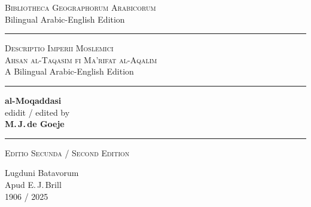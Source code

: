 \documentclass[11pt,a4paper]{article}
\newcommand{\shortline}{\noindent\rule{0.5\textwidth}{0.4pt}\par}
\begin{document}
\thispagestyle{empty}
\begin{center}
\vspace*{2cm}

{\Large\textsc{Bibliotheca Geographorum Arabicorum}}\\[0.3cm]
{\small Bilingual Arabic-English Edition}\\[1.5cm]

\shortline
\vspace{0.8cm}

{\LARGE\scshape Descriptio Imperii Moslemici}\\[0.3cm]
{\large\scshape Ahsan al-Taqasim fi Ma'rifat al-Aqalim}\\[0.3cm]
{\large A Bilingual Arabic-English Edition}\\[0.5cm]

\shortline
\vspace{0.8cm}

{\Large\bfseries al-Moqaddasi}\\[0.3cm]
{\large edidit / edited by}\\[0.3cm]
{\Large\bfseries M.\,J.\,de Goeje}\\[0.8cm]

\shortline
\vspace{0.8cm}

{\large\textsc{Editio Secunda / Second Edition}}\\[1cm]

\vfill

{\large Lugduni Batavorum}\\
{\large Apud E.\,J.\,Brill}\\
{\large 1906 / 2025}\\

\vspace{1.5cm}

\end{center}
\clearpage
\end{document}
